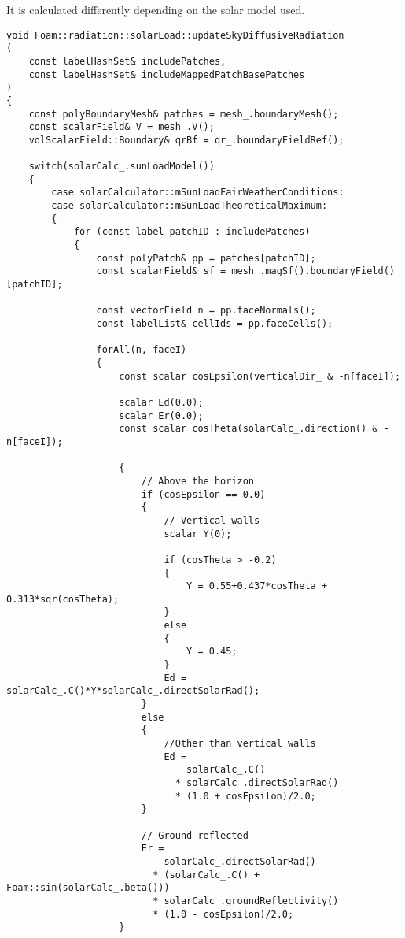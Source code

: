 It is calculated differently depending on the solar model used. 

\begin{verbatim}
void Foam::radiation::solarLoad::updateSkyDiffusiveRadiation
(
    const labelHashSet& includePatches,
    const labelHashSet& includeMappedPatchBasePatches
)
{
    const polyBoundaryMesh& patches = mesh_.boundaryMesh();
    const scalarField& V = mesh_.V();
    volScalarField::Boundary& qrBf = qr_.boundaryFieldRef();

    switch(solarCalc_.sunLoadModel())
    {
        case solarCalculator::mSunLoadFairWeatherConditions:
        case solarCalculator::mSunLoadTheoreticalMaximum:
        {
            for (const label patchID : includePatches)
            {
                const polyPatch& pp = patches[patchID];
                const scalarField& sf = mesh_.magSf().boundaryField()[patchID];

                const vectorField n = pp.faceNormals();
                const labelList& cellIds = pp.faceCells();

                forAll(n, faceI)
                {
                    const scalar cosEpsilon(verticalDir_ & -n[faceI]);

                    scalar Ed(0.0);
                    scalar Er(0.0);
                    const scalar cosTheta(solarCalc_.direction() & -n[faceI]);

                    {
                        // Above the horizon
                        if (cosEpsilon == 0.0)
                        {
                            // Vertical walls
                            scalar Y(0);

                            if (cosTheta > -0.2)
                            {
                                Y = 0.55+0.437*cosTheta + 0.313*sqr(cosTheta);
                            }
                            else
                            {
                                Y = 0.45;
                            }
                            Ed = solarCalc_.C()*Y*solarCalc_.directSolarRad();
                        }
                        else
                        {
                            //Other than vertical walls
                            Ed =
                                solarCalc_.C()
                              * solarCalc_.directSolarRad()
                              * (1.0 + cosEpsilon)/2.0;
                        }

                        // Ground reflected
                        Er =
                            solarCalc_.directSolarRad()
                          * (solarCalc_.C() + Foam::sin(solarCalc_.beta()))
                          * solarCalc_.groundReflectivity()
                          * (1.0 - cosEpsilon)/2.0;
                    }


\end{verbatim}
